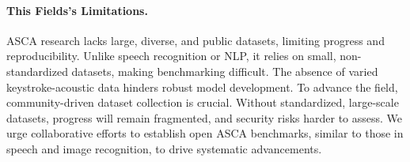 \paragraph{This Fields's Limitations.}
ASCA research lacks large, diverse, and public datasets, limiting progress and reproducibility. Unlike speech recognition or NLP, it relies on small, non-standardized datasets, making benchmarking difficult. The absence of varied keystroke-acoustic data hinders robust model development. To advance the field, community-driven dataset collection is crucial. Without standardized, large-scale datasets, progress will remain fragmented, and security risks harder to assess. We urge collaborative efforts to establish open ASCA benchmarks, similar to those in speech and image recognition, to drive systematic advancements.

